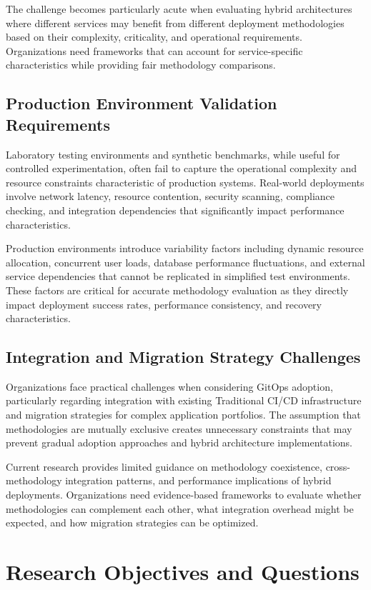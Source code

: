 The challenge becomes particularly acute when evaluating hybrid architectures where different services may benefit from different deployment methodologies based on their complexity, criticality, and operational requirements. Organizations need frameworks that can account for service-specific characteristics while providing fair methodology comparisons.

\subsection{Production Environment Validation Requirements}
Laboratory testing environments and synthetic benchmarks, while useful for controlled experimentation, often fail to capture the operational complexity and resource constraints characteristic of production systems. Real-world deployments involve network latency, resource contention, security scanning, compliance checking, and integration dependencies that significantly impact performance characteristics.

Production environments introduce variability factors including dynamic resource allocation, concurrent user loads, database performance fluctuations, and external service dependencies that cannot be replicated in simplified test environments. These factors are critical for accurate methodology evaluation as they directly impact deployment success rates, performance consistency, and recovery characteristics.

\subsection{Integration and Migration Strategy Challenges}
Organizations face practical challenges when considering GitOps adoption, particularly regarding integration with existing Traditional CI/CD infrastructure and migration strategies for complex application portfolios. The assumption that methodologies are mutually exclusive creates unnecessary constraints that may prevent gradual adoption approaches and hybrid architecture implementations.

Current research provides limited guidance on methodology coexistence, cross-methodology integration patterns, and performance implications of hybrid deployments. Organizations need evidence-based frameworks to evaluate whether methodologies can complement each other, what integration overhead might be expected, and how migration strategies can be optimized.

\section{Research Objectives and Questions}

